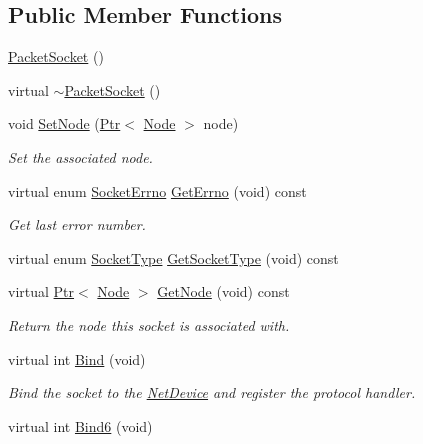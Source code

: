 \subsection*{Public Member Functions}
\begin{DoxyCompactItemize}
\item 
\hyperlink{classns3_1_1PacketSocket_aa9ad19e9cbfaa8330e2786612c7721d1}{Packet\+Socket} ()
\item 
virtual \hyperlink{classns3_1_1PacketSocket_ac758e4960755dc9eea9f2ec938bc2bb4}{$\sim$\+Packet\+Socket} ()
\item 
void \hyperlink{classns3_1_1PacketSocket_ac3b622ebee97e4b5cc78ed69c1e74bc5}{Set\+Node} (\hyperlink{classns3_1_1Ptr}{Ptr}$<$ \hyperlink{classns3_1_1Node}{Node} $>$ node)
\begin{DoxyCompactList}\small\item\em Set the associated node. \end{DoxyCompactList}\item 
virtual enum \hyperlink{classns3_1_1Socket_ada1328c5ae0c28cb2a982caf8f6d6cca}{Socket\+Errno} \hyperlink{classns3_1_1PacketSocket_ad172bfb7074b6bc631d32698b5055570}{Get\+Errno} (void) const 
\begin{DoxyCompactList}\small\item\em Get last error number. \end{DoxyCompactList}\item 
virtual enum \hyperlink{classns3_1_1Socket_a698fbcc486a48b7a0d2b0e4ab863d571}{Socket\+Type} \hyperlink{classns3_1_1PacketSocket_ab9e1551e23008f93983bc22f7a4e1579}{Get\+Socket\+Type} (void) const 
\item 
virtual \hyperlink{classns3_1_1Ptr}{Ptr}$<$ \hyperlink{classns3_1_1Node}{Node} $>$ \hyperlink{classns3_1_1PacketSocket_a247e66e20667d10c1aab2d3cb9158ba8}{Get\+Node} (void) const 
\begin{DoxyCompactList}\small\item\em Return the node this socket is associated with. \end{DoxyCompactList}\item 
virtual int \hyperlink{classns3_1_1PacketSocket_a1c05582ce254f43c42d91dec28957e75}{Bind} (void)
\begin{DoxyCompactList}\small\item\em Bind the socket to the \hyperlink{classns3_1_1NetDevice}{Net\+Device} and register the protocol handler. \end{DoxyCompactList}\item 
virtual int \hyperlink{classns3_1_1PacketSocket_a830ab9b76cfd7668d80564b142c276d1}{Bind6} (void)

\end{DoxyCompactItemize}
